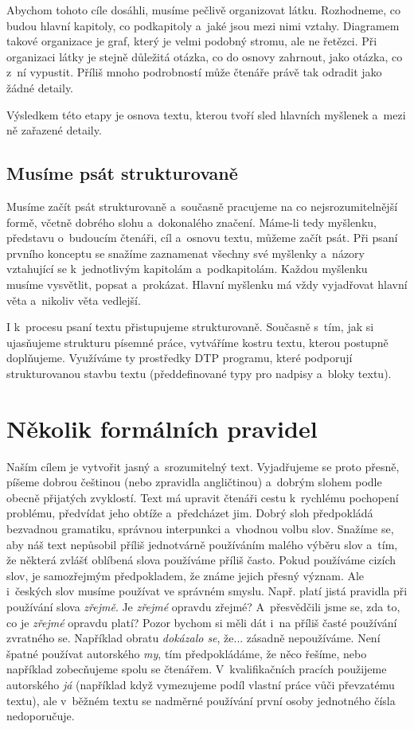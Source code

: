 Abychom tohoto cíle dosáhli, musíme pečlivě organizovat látku. Rozhodneme, co budou hlavní kapitoly, co podkapitoly a~jaké jsou mezi nimi vztahy. Diagramem takové organizace je graf, který je velmi podobný stromu, ale ne řetězci. Při organizaci látky je stejně důležitá otázka, co do osnovy zahrnout, jako otázka, co z~ní vypustit. Příliš mnoho podrobností může čtenáře právě tak odradit jako žádné detaily.

Výsledkem této etapy je osnova textu, kterou tvoří sled hlavních myšlenek a~mezi ně zařazené detaily.

\section{Musíme psát strukturovaně} 
Musíme začít psát strukturovaně a~současně pracujeme na co nejsrozumitelnější formě, včetně dobrého slohu a~dokonalého značení. 
Máme-li tedy myšlenku, představu o~budoucím čtenáři, cíl a~osnovu textu, můžeme začít psát. Při psaní prvního konceptu se snažíme zaznamenat všechny své myšlenky a~názory vztahující se k~jednotlivým kapitolám a~podkapitolám. Každou myšlenku musíme vysvětlit, popsat a~prokázat. Hlavní myšlenku má vždy vyjadřovat hlavní věta a~nikoliv věta vedlejší.

I k~procesu psaní textu přistupujeme strukturovaně. Současně s~tím, jak si ujasňujeme strukturu písemné práce, vytváříme kostru textu, kterou postupně doplňujeme. Využíváme ty prostředky DTP programu, které podporují strukturovanou stavbu textu (předdefinované typy pro nadpisy a~bloky textu). 


\chapter{Několik formálních pravidel}
Naším cílem je vytvořit jasný a~srozumitelný text. Vyjadřujeme se proto přesně, píšeme dobrou češtinou (nebo zpravidla angličtinou) a~dobrým slohem podle obecně přijatých zvyklostí. Text má upravit čtenáři cestu k~rychlému pochopení problému, předvídat jeho obtíže a~předcházet jim. Dobrý sloh předpokládá bezvadnou gramatiku, správnou interpunkci a~vhodnou volbu slov. Snažíme se, aby náš text nepůsobil příliš jednotvárně používáním malého výběru slov a~tím, že některá zvlášť oblíbená slova používáme příliš často. Pokud používáme cizích slov, je samozřejmým předpokladem, že známe jejich přesný význam. Ale i~českých slov musíme používat ve správném smyslu. Např. platí jistá pravidla při používání slova {\it zřejmě}. Je {\it zřejmé} opravdu zřejmé? A~přesvědčili jsme se, zda to, co je {\it zřejmé} opravdu platí? Pozor bychom si měli dát i~na příliš časté používání zvratného se. Například obratu {\it dokázalo se}, že... zásadně nepoužíváme. Není špatné používat autorského {\it my}, tím předpokládáme, že něco 
řešíme, nebo například zobecňujeme spolu se čtenářem. V~kvalifikačních pracích použijeme autorského {\it já} (například když vymezujeme podíl vlastní práce vůči převzatému textu), ale v~běžném textu se nadměrné používání první osoby jednotného čísla nedoporučuje.


